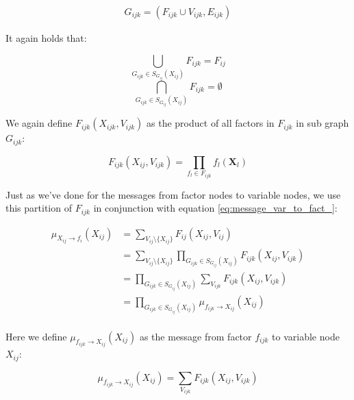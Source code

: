 \begin{equation}\begin{split}
G_{ijk} = (F_{ijk} \cup V_{ijk}, E_{ijk})
\end{split}\end{equation}

\noindent
It again holds that:

\begin{multicols}{2}
\begin{equation}
\bigcup_{G_{ijk} \in S_{G_{ij}}(X_{ij})} F_{ijk} = F_{ij}
\end{equation}
\break
\begin{equation}
\bigcap_{G_{ijk} \in S_{G_{ij}}(X_{ij})} F_{ijk} = \emptyset
\end{equation}
\end{multicols}

\noindent
We again define $F_{ijk}(X_{ijk}, V_{ijk})$ as the product of 
all factors in $F_{ijk}$ in sub graph $G_{ijk}$:

\begin{equation}
F_{ijk}(X_{ij}, V_{ijk}) = \prod_{f_l \in F_{ijk}} f_l(\textbf{X}_l)
\end{equation}

\noindent
Just as we've done for the messages from factor nodes to variable
nodes, we use this partition of $F_{ijk}$ in conjunction with equation
\ref{eq:message_var_to_fact_}:

\begin{equation}\begin{split}
\mu_{X_{ij} \rightarrow f_i}(X_{ij}) 
	&= \sum_{V_{ij} \setminus \{X_{ij}\}}F_{ij}(X_{ij}, V_{ij}) \\
	&= \sum_{V_{ij} \setminus \{X_{ij}\}} 
		\prod_{G_{ijk} \in S_{G_{ij}}(X_{ij})} F_{ijk}(X_{ij}, V_{ijk}) \\
	&=  \prod_{G_{ijk} \in S_{G_{ij}}(X_{ij})} 
		\sum_{V_{ijk} }F_{ijk}(X_{ij}, V_{ijk}) \\
	&= \prod_{G_{ijk} \in S_{G_{ij}}(X_{ij})} 
		\mu_{f_{ijk}\rightarrow X_{ij}}(X_{ij})\\
\end{split}\end{equation}

\noindent
Here we define $\mu_{f_{ijk} \rightarrow X_{ij}}(X_{ij})$ as the
message from factor $f_{ijk}$ to variable node $X_{ij}$:

\begin{equation}
\mu_{f_{ijk} \rightarrow X_{ij}}(X_{ij}) 
	= \sum_{V_{ijk} }F_{ijk}(X_{ij}, V_{ijk})
\end{equation}

